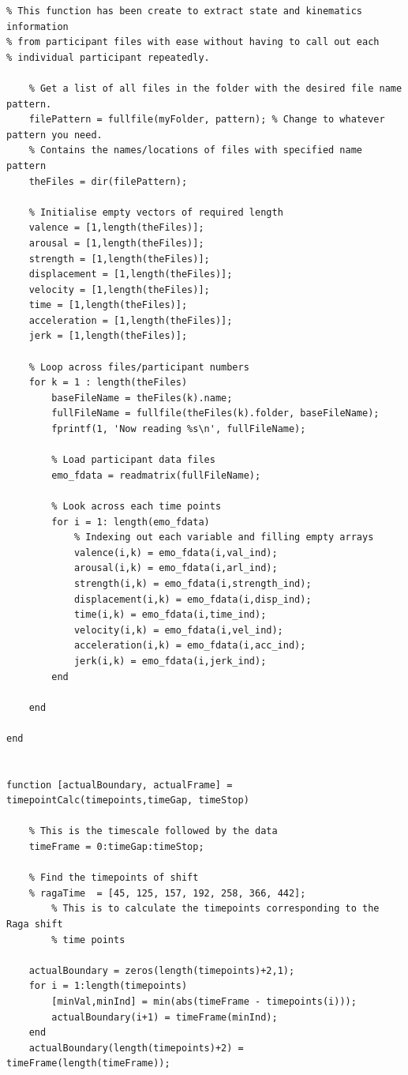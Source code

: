 \begin{lstlisting}
% This function has been create to extract state and kinematics information
% from participant files with ease without having to call out each
% individual participant repeatedly. 

    % Get a list of all files in the folder with the desired file name pattern.
    filePattern = fullfile(myFolder, pattern); % Change to whatever pattern you need.
    % Contains the names/locations of files with specified name pattern
    theFiles = dir(filePattern);
    
    % Initialise empty vectors of required length
    valence = [1,length(theFiles)];
    arousal = [1,length(theFiles)];
    strength = [1,length(theFiles)];
    displacement = [1,length(theFiles)];
    velocity = [1,length(theFiles)];
    time = [1,length(theFiles)];
    acceleration = [1,length(theFiles)];
    jerk = [1,length(theFiles)];

    % Loop across files/participant numbers
    for k = 1 : length(theFiles)
        baseFileName = theFiles(k).name;
        fullFileName = fullfile(theFiles(k).folder, baseFileName);
        fprintf(1, 'Now reading %s\n', fullFileName);
        
        % Load participant data files
        emo_fdata = readmatrix(fullFileName);
        
        % Look across each time points
        for i = 1: length(emo_fdata)
            % Indexing out each variable and filling empty arrays
            valence(i,k) = emo_fdata(i,val_ind);
            arousal(i,k) = emo_fdata(i,arl_ind);
            strength(i,k) = emo_fdata(i,strength_ind);
            displacement(i,k) = emo_fdata(i,disp_ind);
            time(i,k) = emo_fdata(i,time_ind);
            velocity(i,k) = emo_fdata(i,vel_ind);
            acceleration(i,k) = emo_fdata(i,acc_ind);
            jerk(i,k) = emo_fdata(i,jerk_ind);
        end
            
    end
    
end


function [actualBoundary, actualFrame] = timepointCalc(timepoints,timeGap, timeStop)
    
    % This is the timescale followed by the data   
    timeFrame = 0:timeGap:timeStop;
    
    % Find the timepoints of shift
    % ragaTime  = [45, 125, 157, 192, 258, 366, 442];
        % This is to calculate the timepoints corresponding to the Raga shift
        % time points

    actualBoundary = zeros(length(timepoints)+2,1);
    for i = 1:length(timepoints)
        [minVal,minInd] = min(abs(timeFrame - timepoints(i)));
        actualBoundary(i+1) = timeFrame(minInd);
    end
    actualBoundary(length(timepoints)+2) = timeFrame(length(timeFrame));
    

\end{lstlisting}
